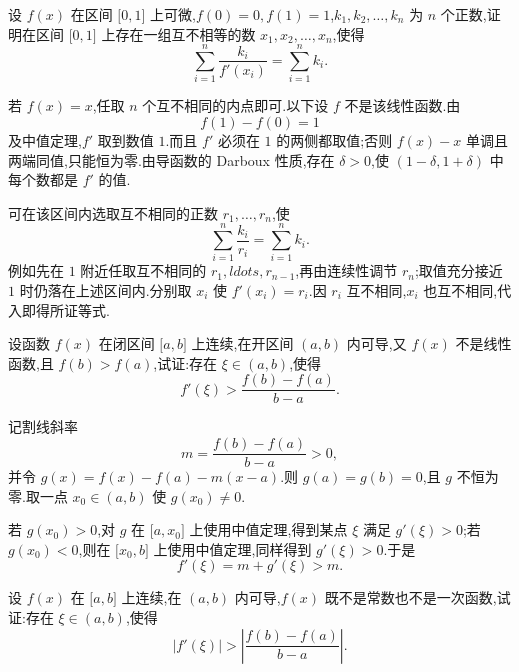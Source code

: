 \begin{example}
    设 $f(x)$ 在区间 $\lbrack 0,1\rbrack$ 上可微,$f(0)=0,f(1)=1$,$k_1,k_2,\ldots,k_n$ 为 $n$ 个正数,证明在区间 $\lbrack 0,1\rbrack$ 上存在一组互不相等的数 $x_1,x_2,\ldots,x_n$,使得
    \[
        \displaystyle\sum\limits_{i=1}^n\dfrac{k_i}{f'(x_i)}
        =\sum\limits_{i=1}^n k_i.
    \]
\end{example}
\exampleblank

\begin{solution}
    若 $f(x)=x$,任取 $n$ 个互不相同的内点即可.以下设 $f$ 不是该线性函数.由
    \[
        f(1)-f(0)=1
    \]
    及中值定理,$f'$ 取到数值 $1$.而且 $f'$ 必须在 $1$ 的两侧都取值;否则 $f(x)-x$ 单调且两端同值,只能恒为零.由导函数的 Darboux 性质,存在 $\delta>0$,使 $(1-\delta,1+\delta)$ 中每个数都是 $f'$ 的值.

    可在该区间内选取互不相同的正数 $r_1,\ldots,r_n$,使
    \[
        \displaystyle\sum\limits_{i=1}^{n}\dfrac{k_i}{r_i}
        =\sum\limits_{i=1}^{n}k_i.
    \]
    例如先在 $1$ 附近任取互不相同的 $r_1,ldots,r_{n-1}$,再由连续性调节 $r_n$;取值充分接近 $1$ 时仍落在上述区间内.分别取 $x_i$ 使 $f'(x_i)=r_i$.因 $r_i$ 互不相同,$x_i$ 也互不相同,代入即得所证等式.
\end{solution}

\begin{example}
    设函数 $f(x)$ 在闭区间 $\lbrack a,b\rbrack$ 上连续,在开区间 $(a,b)$ 内可导,又 $f(x)$ 不是线性函数,且 $f(b)>f(a)$,试证:存在 $\xi\in(a,b)$,使得
    \[
        f'(\xi)>\dfrac{f(b)-f(a)}{b-a}.
    \]
\end{example}
\exampleblank

\begin{solution}
    记割线斜率
    \[
        m=\dfrac{f(b)-f(a)}{b-a}>0,
    \]
    并令 $g(x)=f(x)-f(a)-m(x-a)$.则 $g(a)=g(b)=0$,且 $g$ 不恒为零.取一点 $x_0\in(a,b)$ 使 $g(x_0)\neq0$.

    若 $g(x_0)>0$,对 $g$ 在 $\lbrack a,x_0\rbrack$ 上使用中值定理,得到某点 $\xi$ 满足 $g'(\xi)>0$;若 $g(x_0)<0$,则在 $\lbrack x_0,b\rbrack$ 上使用中值定理,同样得到 $g'(\xi)>0$.于是
    \[
        f'(\xi)=m+g'(\xi)>m.
    \]
\end{solution}

\begin{example}
    设 $f(x)$ 在 $\lbrack a,b\rbrack$ 上连续,在 $(a,b)$ 内可导,$f(x)$ 既不是常数也不是一次函数,试证:存在 $\xi\in(a,b)$,使得
    \[
        |f'(\xi)|>\left|\dfrac{f(b)-f(a)}{b-a}\right|.
    \]
\end{example}
\exampleblank

